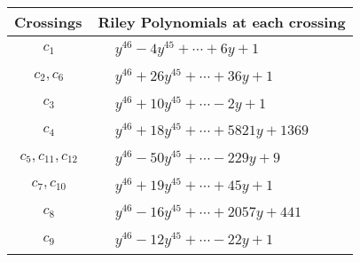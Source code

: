 \documentclass[1p]{elsarticle_modified}
\theoremstyle{definition}
\begin{document}
\begin{tabular}{m{50pt}|m{274pt}}
Crossings & \hspace{64pt}Riley Polynomials at each crossing \\
\hline $$\begin{aligned}c_{1}\end{aligned}$$&$\begin{aligned}
&y^{46}-4 y^{45}+\cdots+6 y+1
\end{aligned}$\\
\hline $$\begin{aligned}c_{2},c_{6}\end{aligned}$$&$\begin{aligned}
&y^{46}+26 y^{45}+\cdots+36 y+1
\end{aligned}$\\
\hline $$\begin{aligned}c_{3}\end{aligned}$$&$\begin{aligned}
&y^{46}+10 y^{45}+\cdots-2 y+1
\end{aligned}$\\
\hline $$\begin{aligned}c_{4}\end{aligned}$$&$\begin{aligned}
&y^{46}+18 y^{45}+\cdots+5821 y+1369
\end{aligned}$\\
\hline $$\begin{aligned}c_{5},c_{11},c_{12}\end{aligned}$$&$\begin{aligned}
&y^{46}-50 y^{45}+\cdots-229 y+9
\end{aligned}$\\
\hline $$\begin{aligned}c_{7},c_{10}\end{aligned}$$&$\begin{aligned}
&y^{46}+19 y^{45}+\cdots+45 y+1
\end{aligned}$\\
\hline $$\begin{aligned}c_{8}\end{aligned}$$&$\begin{aligned}
&y^{46}-16 y^{45}+\cdots+2057 y+441
\end{aligned}$\\
\hline $$\begin{aligned}c_{9}\end{aligned}$$&$\begin{aligned}
&y^{46}-12 y^{45}+\cdots-22 y+1
\end{aligned}$\\
\hline
\end{tabular}\\~\\
\end{document}
